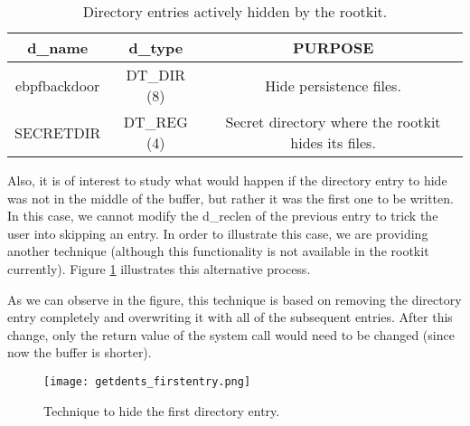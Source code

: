\begin{table}[htbp]
\begin{tabular}{|c|c|c|}
\hline
\textbf{d\_name} & \textbf{d\_type} & \textbf{PURPOSE} \\
\hline
\hline
ebpfbackdoor & DT\_DIR (8) & Hide persistence files.\\
\hline
SECRETDIR & DT\_REG (4) & Secret directory where the rootkit hides its files.\\
\hline
\end{tabular}
\caption{Directory entries actively hidden by the rootkit.}
\label{table:dtype_dirent}
\end{table}

Also, it is of interest to study what would happen if the directory entry to hide was not in the middle of the buffer, but rather it was the first one to be written. In this case, we cannot modify the d\_reclen of the previous entry to trick the user into skipping an entry. In order to illustrate this case, we are providing another technique (although this functionality is not available in the rootkit currently). Figure \ref{fig:getdents_firstentry} illustrates this alternative process.

As we can observe in the figure, this technique is based on removing the directory entry completely and overwriting it with all of the subsequent entries. After this change, only the return value of the system call would need to be changed (since now the buffer is shorter).

\begin{figure}[htbp]
	\centering
	\texttt{[image: getdents\_firstentry.png]}
	\caption{Technique to hide the first directory entry.}
	\label{fig:getdents_firstentry}
\end{figure}



